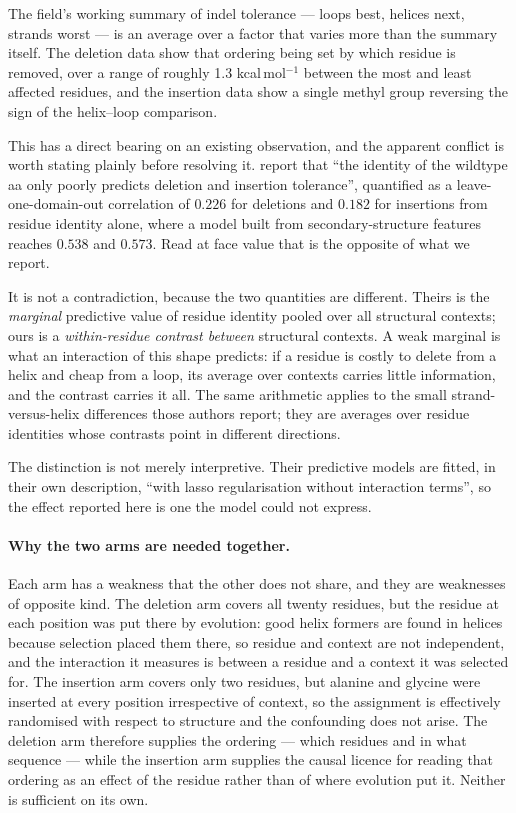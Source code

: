 \documentclass[11pt]{article}
\begin{document}
The field's working summary of indel tolerance --- loops best, helices next, strands worst --- is
an average over a factor that varies more than the summary itself. The deletion data show that
ordering being set by which residue is removed, over a range of roughly 1.3 kcal\,mol$^{-1}$
between the most and least affected residues, and the insertion data show a single methyl group
reversing the sign of the helix--loop comparison.

This has a direct bearing on an existing observation, and the apparent conflict is worth stating
plainly before resolving it. \citet{topolska2025} report that ``the identity of the wildtype aa
only poorly predicts deletion and insertion tolerance'', quantified as a leave-one-domain-out
correlation of $0.226$ for deletions and $0.182$ for insertions from residue identity alone, where
a model built from secondary-structure features reaches $0.538$ and $0.573$. Read at face value
that is the opposite of what we report.

It is not a contradiction, because the two quantities are different. Theirs is the
\emph{marginal} predictive value of residue identity pooled over all structural contexts; ours is
a \emph{within-residue contrast between} structural contexts. A weak marginal is what an
interaction of this shape predicts: if a residue is costly to delete from a helix and cheap from a
loop, its average over contexts carries little information, and the contrast carries it all.
The same arithmetic applies to the small strand-versus-helix differences those authors report;
they are averages over residue identities whose contrasts point in different directions.

The distinction is not merely interpretive. Their predictive models are fitted, in their own
description, ``with lasso regularisation without interaction terms'', so the effect reported here
is one the model could not express.

\paragraph{Why the two arms are needed together.} Each arm has a weakness that the other does not
share, and they are weaknesses of opposite kind. The deletion arm covers all twenty residues, but
the residue at each position was put there by evolution: good helix formers are found in helices
because selection placed them there, so residue and context are not independent, and the
interaction it measures is between a residue and a context it was selected for. The insertion arm
covers only two residues, but alanine and glycine were inserted at every position irrespective of
context, so the assignment is effectively randomised with respect to structure and the
confounding does not arise. The deletion arm therefore supplies the ordering --- which residues
and in what sequence --- while the insertion arm supplies the causal licence for reading that
ordering as an effect of the residue rather than of where evolution put it. Neither is sufficient
on its own.
\end{document}
